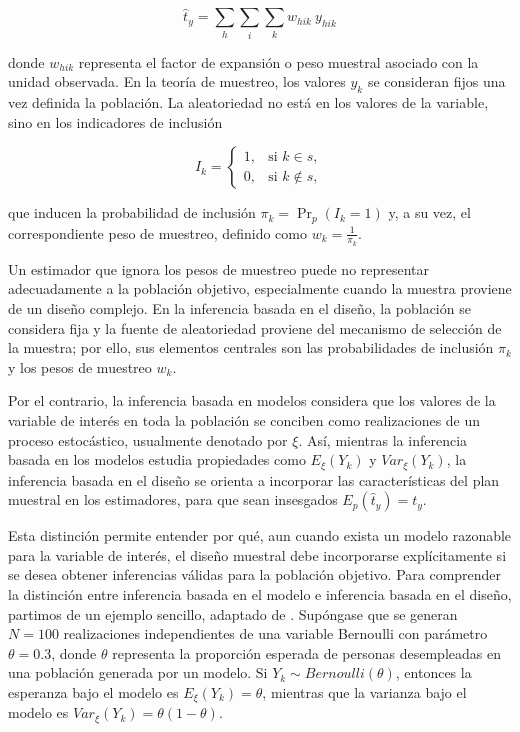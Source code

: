 \documentclass[
  spanish,
  12pt,
]{book}
\begin{document}
\[
\hat{t}_y = \sum_h \sum_i \sum_k w_{hik} \ y_{hik}
\]

donde \(w_{hik}\) representa el factor de expansión o peso muestral asociado con la unidad observada. En la teoría de muestreo, los valores \(y_k\) se consideran fijos una vez definida la población. La aleatoriedad no está en los valores de la variable, sino en los indicadores de inclusión

\[
I_k =
\begin{cases}
1, & \text{si } k \in s,\\
0, & \text{si } k \notin s,
\end{cases}
\]

que inducen la probabilidad de inclusión \(\pi_k = \Pr_p(I_k=1)\) y, a su vez, el correspondiente peso de muestreo, definido como \(w_k = \frac{1}{\pi_k}\).

Un estimador que ignora los pesos de muestreo puede no representar adecuadamente a la población objetivo, especialmente cuando la muestra proviene de un diseño complejo. En la inferencia basada en el diseño, la población se considera fija y la fuente de aleatoriedad proviene del mecanismo de selección de la muestra; por ello, sus elementos centrales son las probabilidades de inclusión \(\pi_k\) y los pesos de muestreo \(w_k\).

Por el contrario, la inferencia basada en modelos considera que los valores de la variable de interés en toda la población se conciben como realizaciones de un proceso estocástico, usualmente denotado por \(\xi\). Así, mientras la inferencia basada en los modelos estudia propiedades como \(E_{\xi}(Y_k)\) y \(Var_{\xi}(Y_k)\), la inferencia basada en el diseño se orienta a incorporar las características del plan muestral en los estimadores, para que sean insesgados \(E_{p}(\hat{t}_y) = t_y\).

Esta distinción permite entender por qué, aun cuando exista un modelo razonable para la variable de interés, el diseño muestral debe incorporarse explícitamente si se desea obtener inferencias válidas para la población objetivo. Para comprender la distinción entre inferencia basada en el modelo e inferencia basada en el diseño, partimos de un ejemplo sencillo, adaptado de \citet{binder2011estimating}. Supóngase que se generan \(N=100\) realizaciones independientes de una variable Bernoulli con parámetro \(\theta=0.3\), donde \(\theta\) representa la proporción esperada de personas desempleadas en una población generada por un modelo. Si \(Y_k \sim Bernoulli(\theta)\), entonces la esperanza bajo el modelo es \(E_{\xi}(Y_k) = \theta\), mientras que la varianza bajo el modelo es \(Var_{\xi}(Y_k) = \theta(1-\theta)\).
\end{document}
